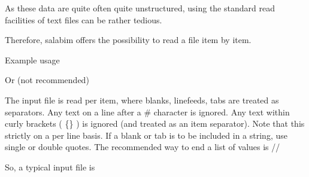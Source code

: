 \documentclass[letterpaper,10pt,english]{sphinxmanual}
\begin{document}
As these data are quite often quite unstructured, using the standard read facilities of text files can be rather tedious.

Therefore, salabim offers the possibility to read a file item by item.

Example usage

%
\begin{sphinxVerbatim}[commandchars=\\\{\}]
   
      
      
\end{sphinxVerbatim}

Or (not recommended)

%
\begin{sphinxVerbatim}[commandchars=\\\{\}]
  
  
  
\end{sphinxVerbatim}

The input file is read per item, where blanks, linefeeds, tabs are treated as separators. 
Any text on a line after a \# character is ignored. 
Any text within curly brackets ( \{\} ) is ignored (and treated as an item separator). 
Note that this strictly on a per line basis. 
If a blank or tab is to be included in a string, use single or double quotes.  
The recommended way to end a list of values is //

So, a typical input file is
\end{document}
